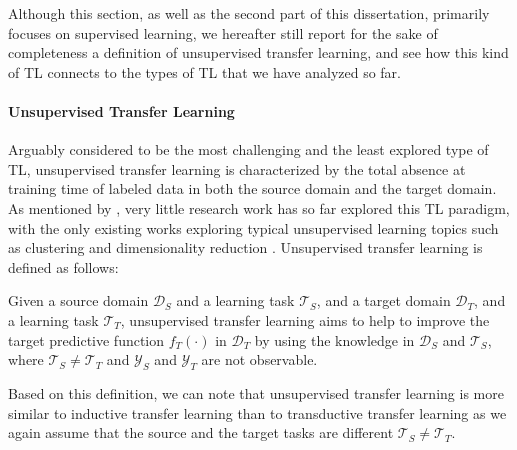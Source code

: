Although this section, as well as the second part of this dissertation, primarily focuses on supervised learning, we hereafter still report for the sake of completeness a definition of unsupervised transfer learning, and see how this kind of TL connects to the types of TL that we have analyzed so far.

\paragraph{\textbf{\uppercase{U}nsupervised \uppercase{T}ransfer \uppercase{L}earning}}
Arguably considered to be the most challenging and the least explored type of TL, unsupervised transfer learning is characterized by the total absence at training time of labeled data in both the source domain and the target domain. As mentioned by \citet{pan2009survey}, very little research work has so far explored this TL paradigm, with the only existing works exploring typical unsupervised learning topics such as clustering \cite{dai2008self, jin2011transferring, qian2015cluster} and dimensionality reduction \cite{wang2008transferred, zhu2013self, zhu2016robust}. Unsupervised transfer learning is defined as follows:
\begin{definition}
	Given a source domain $\mathcal{D}_S$ and a learning task $\mathcal{T}_S$, and a target domain $\mathcal{D}_T$, and a learning task $\mathcal{T}_T$, unsupervised transfer learning aims to help to improve the target predictive function $f_T(\cdot)$ in $\mathcal{D}_T$ by using the knowledge in $\mathcal{D}_S$ and $\mathcal{T}_S$, where $\mathcal{T}_S \neq \mathcal{T}_T$ and $\mathcal{Y}_S$ and $\mathcal{Y}_T$ are not observable. 
\end{definition}
Based on this definition, we can note that unsupervised transfer learning is more similar to inductive transfer learning than to transductive transfer learning as we again assume that the source and the target tasks are different $\mathcal{T}_S \neq \mathcal{T}_T$.


